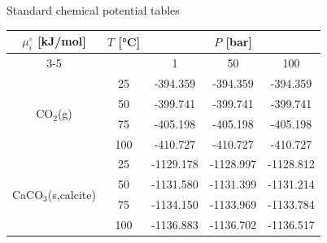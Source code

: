 \begin{frame}[allowframebreaks]{Standard chemical potential tables}
\begin{center}
{\footnotesize{}}%
\begin{tabular*}{1\columnwidth}{@{\extracolsep{\fill}}ccccc}
\toprule 
\multirow{2}{*}{$\mu_{i}^{\circ}$ {[}kJ/mol{]}} & \multirow{2}{*}{{\footnotesize{}$T$ {[}°C{]}}} & \multicolumn{3}{c}{{\footnotesize{}$P$ {[}bar{]}}}\tabularnewline
\cmidrule{3-5} \cmidrule{4-5} \cmidrule{5-5} 
 &  & {\footnotesize{}1} & {\footnotesize{}50} & {\footnotesize{}100}\tabularnewline
\midrule
\multirow{4}{*}{{\footnotesize{}CO$_{2}$(g)}} & {\footnotesize{}25} & {\footnotesize{}-394.359} & {\footnotesize{}-394.359} & {\footnotesize{}-394.359}\tabularnewline
 & {\footnotesize{}50} & {\footnotesize{}-399.741} & {\footnotesize{}-399.741} & {\footnotesize{}-399.741}\tabularnewline
 & {\footnotesize{}75} & {\footnotesize{}-405.198} & {\footnotesize{}-405.198} & {\footnotesize{}-405.198}\tabularnewline
 & {\footnotesize{}100} & {\footnotesize{}-410.727} & {\footnotesize{}-410.727} & {\footnotesize{}-410.727}\tabularnewline
\midrule 
\multirow{4}{*}{{\footnotesize{}CaCO$_{3}$(s,calcite)}} & {\footnotesize{}25} & {\footnotesize{}-1129.178} & {\footnotesize{}-1128.997} & {\footnotesize{}-1128.812}\tabularnewline
 & {\footnotesize{}50} & {\footnotesize{}-1131.580} & {\footnotesize{}-1131.399} & {\footnotesize{}-1131.214}\tabularnewline
 & {\footnotesize{}75} & {\footnotesize{}-1134.150} & {\footnotesize{}-1133.969} & {\footnotesize{}-1133.784}\tabularnewline
 & {\footnotesize{}100} & {\footnotesize{}-1136.883} & {\footnotesize{}-1136.702} & {\footnotesize{}-1136.517}\tabularnewline
\bottomrule
\end{tabular*}{\footnotesize\par}
\par\end{center}

\end{frame}
%
%
